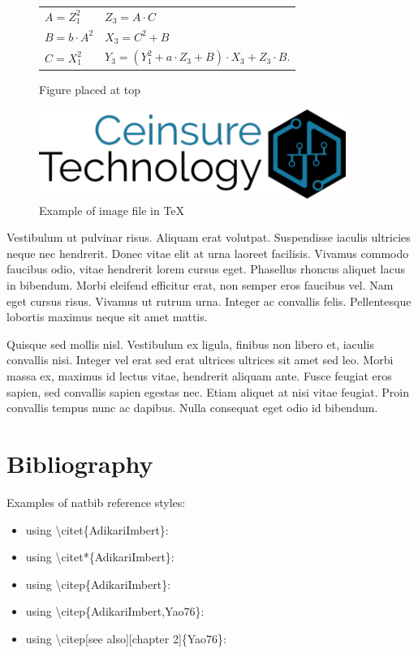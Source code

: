 \documentclass[a4paper,10pt]{article}
\begin{document}
\begin{figure}[t]
\label{figure:top}
\begin{center}
\begin{tabular}{l l}
  $A = Z_1^2$			&	$Z_3 = A\cdot C$ \\
  $B = b\cdot A^2$	&	$X_3 = C^2 + B$\\
  $C = X_1^2$			&  $Y_3 = (Y_1^2 + a\cdot Z_3 + B)\cdot X_3 + Z_3\cdot B$.
\end{tabular}
\end{center}
\caption{Figure placed at top}
\end{figure}

\begin{figure}[t!]
\begin{center}
\includegraphics[width=10cm]{logo}
\caption{Example of image file in \TeX}
\end{center}
\end{figure}

Vestibulum ut pulvinar risus. Aliquam erat volutpat. Suspendisse iaculis ultricies neque nec hendrerit.
Donec vitae elit at urna laoreet facilisis. Vivamus commodo faucibus odio, vitae hendrerit lorem cursus eget.
Phasellus rhoncus aliquet lacus in bibendum. Morbi eleifend efficitur erat, non semper eros faucibus vel.
Nam eget cursus risus. Vivamus ut rutrum urna. Integer ac convallis felis.
Pellentesque lobortis maximus neque sit amet mattis.


Quisque \hspace{5cm} sed mollis nisl. Vestibulum ex ligula, finibus non libero et, iaculis convallis nisi.
Integer vel erat sed erat ultrices ultrices sit amet sed leo. Morbi massa ex, maximus id lectus vitae,
hendrerit aliquam ante. Fusce feugiat eros sapien, sed convallis sapien egestas nec. Etiam aliquet at
nisi vitae feugiat. Proin convallis tempus nunc ac dapibus. Nulla consequat eget odio id bibendum.



\pagebreak
\section*{Bibliography}

Examples of natbib reference styles:
\begin{itemize}
  \item using \textbackslash citet\{AdikariImbert\}: \citet{AdikariImbert}
  \item using \textbackslash citet*\{AdikariImbert\}: \citet*{AdikariImbert}
  \item using \textbackslash citep\{AdikariImbert\}: \citep{AdikariImbert}
  \item using \textbackslash citep\{AdikariImbert,Yao76\}: \citep{AdikariImbert,Yao76}
  \item using \textbackslash citep[see also][chapter 2]\{Yao76\}: \citep[see also][chapter 2]{Yao76}
\end{itemize}
\end{document}
